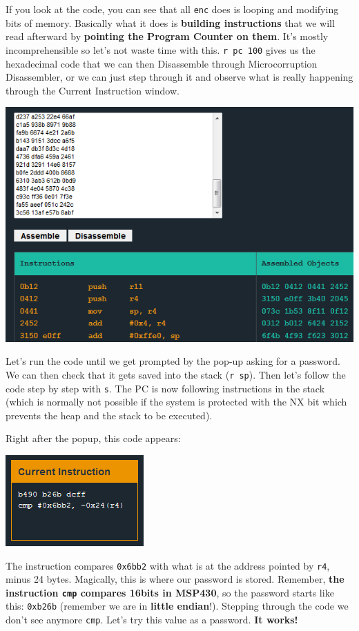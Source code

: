 \documentclass[a4paper,11pt]{article}
\begin{document}
If you look at the code, you can see that all \texttt{enc} does is
looping and modifying bits of memory. Basically what it does is
\textbf{building instructions} that we will read afterward by
\textbf{pointing the Program Counter on them}. It's mostly
incomprehensible so let's not waste time with this. \texttt{r pc 100}
gives us the hexadecimal code that we can then Disassemble through
Microcorruption Disassembler, or we can just step through it and observe
what is really happening through the Current Instruction window.

\includegraphics{img/6_3.PNG}

Let's run the code until we get prompted by the pop-up asking for a
password. We can then check that it gets saved into the stack
(\texttt{r sp}). Then let's follow the code step by step with
\texttt{s}. The PC is now following instructions in the stack (which is
normally not possible if the system is protected with the NX bit which
prevents the heap and the stack to be executed).

Right after the popup, this code appears:

\includegraphics{img/6_2.PNG}

The instruction compares \texttt{0x6bb2} with what is at the address
pointed by \texttt{r4}, minus 24 bytes. Magically, this is where our
password is stored. Remember, \textbf{the instruction \texttt{cmp}
compares 16bits in MSP430}, so the password starts like this:
\texttt{0xb26b} (remember we are in \textbf{little endian}!). Stepping
through the code we don't see anymore \texttt{cmp}. Let's try this value
as a password. \textbf{It works!}
\end{document}
